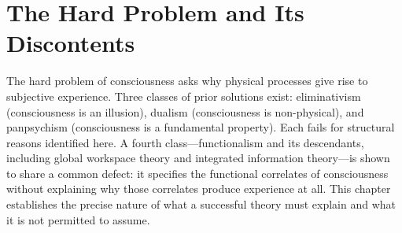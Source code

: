 \chapter{The Hard Problem and Its Discontents}
\label{ch:hard_problem}


\begin{chapterabstract}
The hard problem of consciousness asks why physical processes give rise to subjective experience. Three classes of prior solutions exist: eliminativism (consciousness is an illusion), dualism (consciousness is non-physical), and panpsychism (consciousness is a fundamental property). Each fails for structural reasons identified here. A fourth class---functionalism and its descendants, including global workspace theory and integrated information theory---is shown to share a common defect: it specifies the functional correlates of consciousness without explaining why those correlates produce experience at all. This chapter establishes the precise nature of what a successful theory must explain and what it is not permitted to assume.
\end{chapterabstract}


